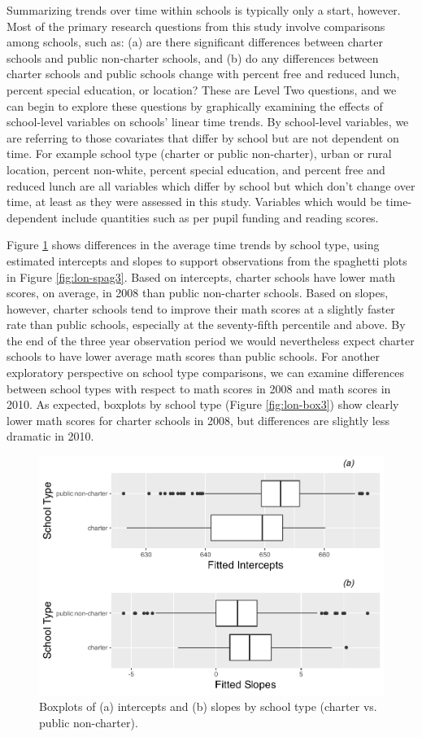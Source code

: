 \documentclass[
]{krantz}
\begin{document}
Summarizing trends over time within schools is typically only a start, however. Most of the primary research questions from this study involve comparisons among schools, such as: (a) are there significant differences between charter schools and public non-charter schools, and (b) do any differences between charter schools and public schools change with percent free and reduced lunch, percent special education, or location? These are Level Two questions, and we can begin to explore these questions by graphically examining the effects of school-level variables on schools' linear time trends. By school-level variables, we are referring to those covariates that differ by school but are not dependent on time. For example school type (charter or public non-charter), urban or rural location, percent non-white, percent special education, and percent free and reduced lunch are all variables which differ by school but which don't change over time, at least as they were assessed in this study. Variables which would be time-dependent include quantities such as per pupil funding and reading scores.

Figure \ref{fig:lon-box2} shows differences in the average time trends by school type, using estimated intercepts and slopes to support observations from the spaghetti plots in Figure \ref{fig:lon-spag3}. Based on intercepts, charter schools have lower math scores, on average, in 2008 than public non-charter schools. Based on slopes, however, charter schools tend to improve their math scores at a slightly faster rate than public schools, especially at the seventy-fifth percentile and above. By the end of the three year observation period we would nevertheless expect charter schools to have lower average math scores than public schools. For another exploratory perspective on school type comparisons, we can examine differences between school types with respect to math scores in 2008 and math scores in 2010. As expected, boxplots by school type (Figure \ref{fig:lon-box3}) show clearly lower math scores for charter schools in 2008, but differences are slightly less dramatic in 2010.

\begin{figure}

{\centering \includegraphics[width=0.6\linewidth]{bookdown-BeyondMLR_files/figure-latex/lon-box2-1} 

}

\caption{Boxplots of (a) intercepts and (b) slopes by school type (charter vs. public non-charter).}\label{fig:lon-box2}
\end{figure}
\end{document}
